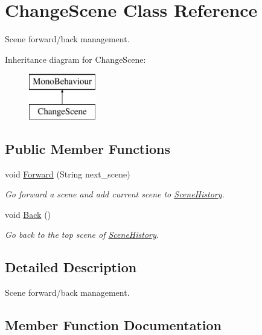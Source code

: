 \hypertarget{class_change_scene}{}\section{Change\+Scene Class Reference}
\label{class_change_scene}


Scene forward/back management.  


Inheritance diagram for Change\+Scene\+:\begin{figure}[H]
\begin{center}
\leavevmode
\includegraphics[height=2.000000cm]{class_change_scene}
\end{center}
\end{figure}
\subsection*{Public Member Functions}
\begin{DoxyCompactItemize}
\item 
void \mbox{\hyperlink{class_change_scene_a9451a67ccf1d11d95d4dd515c173d96e}{Forward}} (String next\+\_\+scene)
\begin{DoxyCompactList}\small\item\em Go forward a scene and add current scene to \mbox{\hyperlink{class_scene_history}{Scene\+History}}. \end{DoxyCompactList}\item 
void \mbox{\hyperlink{class_change_scene_ae93550fcbb1587005d4799278ea4b415}{Back}} ()
\begin{DoxyCompactList}\small\item\em Go back to the top scene of \mbox{\hyperlink{class_scene_history}{Scene\+History}}. \end{DoxyCompactList}\end{DoxyCompactItemize}


\subsection{Detailed Description}
Scene forward/back management. 

\subsection{Member Function Documentation}
\mbox{\label{class_change_scene_ae93550fcbb1587005d4799278ea4b415}} 
